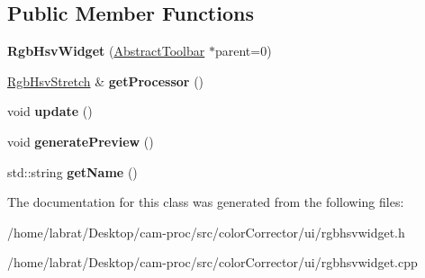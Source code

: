 \subsection*{Public Member Functions}
\begin{DoxyCompactItemize}
\item 
{\bfseries Rgb\+Hsv\+Widget} (\hyperlink{classAbstractToolbar}{Abstract\+Toolbar} $\ast$parent=0)\hypertarget{classRgbHsvWidget_a1a7f20fb3ac12e5e05121b85d4f24452}{}\label{classRgbHsvWidget_a1a7f20fb3ac12e5e05121b85d4f24452}

\item 
\hyperlink{classRgbHsvStretch}{Rgb\+Hsv\+Stretch} \& {\bfseries get\+Processor} ()\hypertarget{classRgbHsvWidget_ada8d5577e880bd9ddf7ea026b95791da}{}\label{classRgbHsvWidget_ada8d5577e880bd9ddf7ea026b95791da}

\item 
void {\bfseries update} ()\hypertarget{classRgbHsvWidget_a8e225eac4bac3e78db77390cbad143d5}{}\label{classRgbHsvWidget_a8e225eac4bac3e78db77390cbad143d5}

\item 
void {\bfseries generate\+Preview} ()\hypertarget{classRgbHsvWidget_ae5edf5e8d6ba7cf95f499df388f60b4e}{}\label{classRgbHsvWidget_ae5edf5e8d6ba7cf95f499df388f60b4e}

\item 
std\+::string {\bfseries get\+Name} ()\hypertarget{classRgbHsvWidget_a693508cc8ad41b466fe820fd7d00f345}{}\label{classRgbHsvWidget_a693508cc8ad41b466fe820fd7d00f345}

\end{DoxyCompactItemize}


The documentation for this class was generated from the following files\+:\begin{DoxyCompactItemize}
\item 
/home/labrat/\+Desktop/cam-\/proc/src/color\+Corrector/ui/rgbhsvwidget.\+h\item 
/home/labrat/\+Desktop/cam-\/proc/src/color\+Corrector/ui/rgbhsvwidget.\+cpp\end{DoxyCompactItemize}
